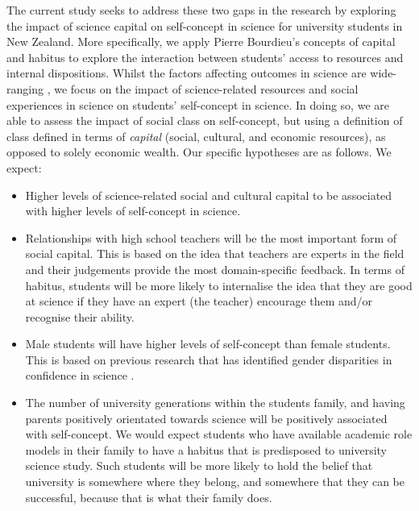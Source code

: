\documentclass[smallextended]{svjour3}       %
\begin{document}
The current study seeks to address these two gaps in the research by exploring the impact of science capital on self-concept in science for university students in New Zealand. More specifically, we apply Pierre Bourdieu's \citeyear{Bourdieu_1986,Bourdieu1984} concepts of capital and habitus to explore the interaction between students' access to resources and internal dispositions. Whilst the factors affecting outcomes in science are wide-ranging 
\cite{osborne2003attitudes}, we focus on the impact of science-related resources and social experiences in science on students' self-concept in science. In doing so, we are able to assess the impact of social class on self-concept, but using a definition of class defined in terms of \textit{capital} (social, cultural, and economic resources), as opposed to solely economic wealth. Our specific hypotheses are as follows. We expect:
\begin{itemize}
    \item Higher levels of science-related social and cultural capital to be associated with higher levels of self-concept in science. 
    \item Relationships with high school teachers will be the most important form of social capital. This is based on the idea that teachers are experts in the field and their judgements provide the most domain-specific feedback. In terms of habitus, students will be more likely to internalise the idea that they are good at science if they have an expert (the teacher) encourage them and/or recognise their ability. 
    \item Male students will have higher levels of self-concept than female students. This is based on previous research that has identified gender disparities in confidence in science \cite{Ellis_2016}. 
    \item The number of university generations within the students family, and having parents positively orientated towards science will be positively associated with self-concept. We would expect students who have available academic role models in their family to have a habitus that is predisposed to university science study. Such students will be more likely to  hold the belief that university is somewhere where they belong, and somewhere that they can be successful, because that is what their family does. 
\end{itemize}
\end{document}
